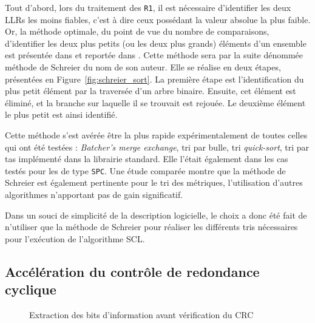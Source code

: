 Tout d'abord, lors du traitement des \noeuds \texttt{R1}, il est nécessaire d'identifier les deux LLRs les moins fiables, c'est à dire ceux possédant la valeur absolue la plus faible. Or, la méthode optimale, du point de vue du nombre de comparaisons, d'identifier les deux plus petits (ou les deux plus grands) éléments d'un ensemble est présentée dans \cite{schreier_tournament_1932} et reportée dans \cite{knuth_art_1973}. Cette méthode sera par la suite dénommée méthode de Schreier du nom de son auteur. Elle se réalise en deux étapes, présentées en Figure~\ref{fig:schreier_sort}. La première étape est l'identification du plus petit élément par la traversée d'un arbre binaire. Ensuite, cet élément est éliminé, et la branche sur laquelle il se trouvait est rejouée. Le deuxième élément le plus petit est ainsi identifié.

Cette méthode s'est avérée être la plus rapide expérimentalement de toutes celles qui ont été testées : \textit{Batcher's merge exchange}, tri par bulle, tri \textit{quick-sort}, tri par tas implémenté dans la librairie standard. Elle l'était également dans les cas testés pour les \noeuds de type \texttt{SPC}. Une étude comparée montre que la méthode de Schreier est également pertinente pour le tri des métriques, l'utilisation d'autres algorithmes n'apportant pas de gain significatif.

Dans un souci de simplicité de la description logicielle, le choix a donc été fait de n'utiliser que la méthode de Schreier pour réaliser les différents tris nécessaires pour l'exécution de l'algorithme SCL.


\subsection{Accélération du contrôle de redondance cyclique}
\begin{figure}[t]
  \centering
  \quad
  \caption{Extraction des bits d'information avant vérification du CRC}
  \label{fig:extract}
\end{figure}

